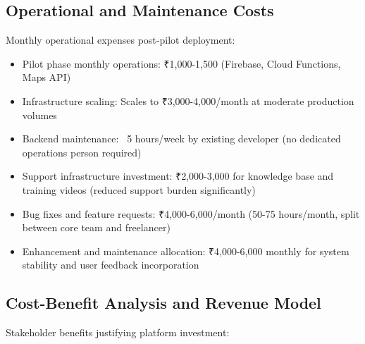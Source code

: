 \documentclass[12pt,a4paper]{report}
\begin{document}
\subsection{Operational and Maintenance Costs}

Monthly operational expenses post-pilot deployment:

\begin{itemize}
  \item Pilot phase monthly operations: ₹1,000-1,500 (Firebase, Cloud Functions, Maps API)
  \item Infrastructure scaling: Scales to ₹3,000-4,000/month at moderate production volumes
  \item Backend maintenance: ~5 hours/week by existing developer (no dedicated operations person required)
  \item Support infrastructure investment: ₹2,000-3,000 for knowledge base and training videos (reduced support burden significantly)
  \item Bug fixes and feature requests: ₹4,000-6,000/month (50-75 hours/month, split between core team and freelancer)
  \item Enhancement and maintenance allocation: ₹4,000-6,000 monthly for system stability and user feedback incorporation
\end{itemize}

\subsection{Cost-Benefit Analysis and Revenue Model}

Stakeholder benefits justifying platform investment:
\end{document}
